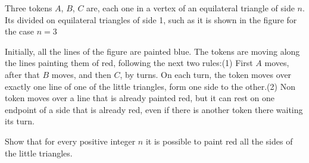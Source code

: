 Three tokens $A$,  $B$,  $C$ are, each one in a vertex of an equilateral triangle of side $n$. Its divided on equilateral triangles of side 1, such as it is shown in the figure for the case $n=3$

Initially, all the lines of the figure are painted blue. The tokens are moving along the lines painting them of red, following the next two rules:(1) First $A$ moves, after that $B$ moves, and then $C$,  by turns. On each turn, the token moves over exactly one line of one of the little triangles, form one side to the other.(2) Non token moves over a line that is already painted red, but it can rest on one endpoint of a side that is already red, even if there is another token there waiting its turn.

Show that for every positive integer $n$ it is possible to paint red all the sides of the little triangles.